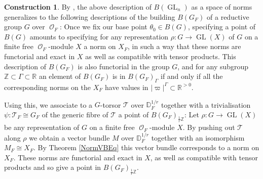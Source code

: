 \documentclass{article}
\DeclareMathOperator{\CO}{\mathcal{O}}
\DeclareMathOperator{\GL}{GL}
\newcommand{\BR}{{\mathbb{R}}}
\newcommand{\BZ}{{\mathbb{Z}}}
\newcommand{\Dr}[1][r]{\mathbb{D}_F^{1/#1}}
\theoremstyle{definition}
\newtheorem{construction}[definition]{Construction}
\theoremstyle{plain}
\begin{document}
\begin{construction} \label{TorsEmb}
    By \cite[Theorem 4.16]{Ziegler22}, the above description of $B(\GL_n)$ as a space of norms generalizes to the following descriptions of the building $B(G_F)$ of a reductive group $G$ over $\CO_F$: Once we fix our base point $\theta_0 \in B(G)$, specifying a point of $B(G)$ amounts to specifying for any representation $\rho\colon G \to \operatorname{GL}(X)$ of $G$ on a finite free $\CO_F$-module $X$ a norm on $X_F$, in such a way that these norms are functorial and exact in $X$ as well as compatible with tensor products. This description of $B(G_F)$ is also functorial in the group $G$, and for any subgroup $\BZ \subset \Gamma \subset \BR$ an element of $B(G_F)$ is in $B(G_F)_\Gamma$ if and only if all the corresponding norms on the $X_F$ have values in $|\varpi|^\Gamma \subset \BR^{>0}$.
    

    Using this, we associate to a $G$-torsor $\mathcal{T}$ over $\Dr$ together with a trivialisation $\psi\colon \mathcal{T}_F \cong G_F$ of the generic fibre of $\mathcal{T}$ a point of $B(G_F)_{\frac{1}{r}\BZ}$: Let $\rho\colon G \to \operatorname{GL}(X)$ be any representation of $G$ on a finite free $\CO_F$-module $X$. By pushing out $\mathcal{T}$ along $\rho$ we obtain a vector bundle $M$ over $\Dr$ together with an isomorphism $M_F \cong X_F$. By Theorem \ref{NormVBEq} this vector bundle corresponds to a norm on $X_F$. These norms are functorial and exact in $X$, as well as compatible with tensor products and so give a point in $B(G_F)_{\frac{1}{r}\BZ}$.
\end{construction}
\end{document}
